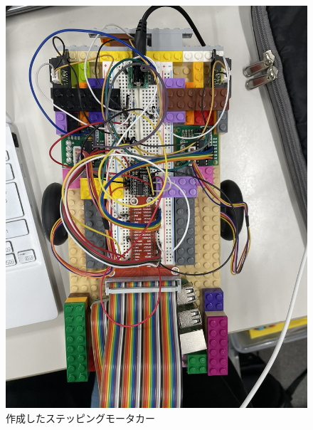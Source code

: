 \documentclass{ltjsarticle} %
\begin{document}
\begin{figure}[H] %
  \centering
  \begin{minipage}{0.45\textwidth} %
    \centering
    \includegraphics[width=\textwidth]{raspi4-1.JPEG} %
    \caption{作成したステッピングモータカー} %
    \label{fig:raspi4-1} %
  \end{minipage}
  \hfill %
  \begin{minipage}{0.45\textwidth} %
    \centering

\end{minipage}
\end{figure}
\end{document}
